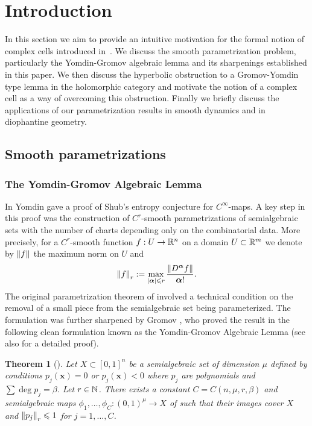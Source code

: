 \documentclass[reqno]{amsart}
\newtheorem*{Thm*}{Theorem}{\bfseries}{\itshape}
\renewcommand\~[1]{\widetilde{#1}}
\def\vx{{\mathbf x}}
\def\valpha{{\boldsymbol\alpha}}
\begin{document}
\setcounter{tocdepth}{1}
{\small \tableofcontents}

\section{Introduction}
\label{sec:intro}

In this section we aim to provide an intuitive motivation for the
formal notion of complex cells introduced
in~. We discuss the smooth parametrization
problem, particularly the Yomdin-Gromov algebraic lemma and its
sharpenings established in this paper. We then discuss the hyperbolic
obstruction to a Gromov-Yomdin type lemma in the holomorphic category
and motivate the notion of a complex cell as a way of overcoming this
obstruction. Finally we briefly discuss the applications of our
parametrization results in smooth dynamics and in diophantine
geometry.

\subsection{Smooth parametrizations}
\label{sec:intro-smooth}

\subsubsection{The Yomdin-Gromov Algebraic Lemma}

In \cite{yomdin:entropy,yomdin:gy} Yomdin gave a proof of Shub's
entropy conjecture for $C^\infty$-maps. A key step in this proof was
the construction of $C^r$-smooth parametrizations of semialgebraic
sets with the number of charts depending only on the combinatorial
data. More precisely, for a $C^r$-smooth function
$f:U\to{\mathbb R}^n$ on a domain $U\subset{\mathbb R}^m$ we denote by
$\left\Vert f \right\Vert$ the maximum norm on $U$ and
\begin{equation}
  \norm{f}_r := \max_{|\valpha|\le r} \frac{\norm{D^\valpha f}}{\valpha!}.
\end{equation}
The original parametrization theorem of
\cite{yomdin:entropy,yomdin:gy} involved a technical condition on the
removal of a small piece from the semialgebraic set being
parameterized. The formulation was further sharpened by Gromov
\cite{gromov:gy}, who proved the result in the following clean
formulation known as the Yomdin-Gromov Algebraic Lemma (see also
\cite{burguet:alg-lemma} for a detailed proof).

\begin{Thm*}[]
  Let $X\subset[0,1]^n$ be a semialgebraic set of dimension $\mu$
  defined by conditions $p_j(\vx)=0$ or $p_j(\vx)<0$ where $p_j$ are
  polynomials and $\sum\deg p_j=\beta$. Let $r\in{\mathbb N}$. There exists a
  constant $C=C(n,\mu,r,\beta)$ and semialgebraic maps
  $\phi_1,\ldots,\phi_C:(0,1)^\mu\to X$ of such that their images
  cover $X$ and $\left\Vert p_j \right\Vert_r\leqslant 1$ for $j=1,\ldots,C$.
\end{Thm*}
\end{document}
